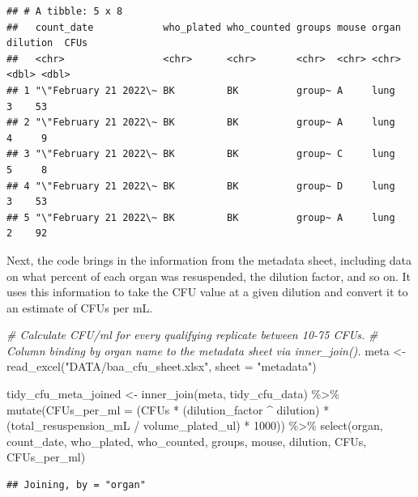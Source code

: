 \documentclass[
]{book}
\newenvironment{Shaded}{\begin{snugshade}}{\end{snugshade}}
\newcommand{\AttributeTok}[1]{\textcolor[rgb]{0.77,0.63,0.00}{#1}}
\newcommand{\CommentTok}[1]{\textcolor[rgb]{0.56,0.35,0.01}{\textit{#1}}}
\newcommand{\DecValTok}[1]{\textcolor[rgb]{0.00,0.00,0.81}{#1}}
\newcommand{\FunctionTok}[1]{\textcolor[rgb]{0.00,0.00,0.00}{#1}}
\newcommand{\NormalTok}[1]{#1}
\newcommand{\OtherTok}[1]{\textcolor[rgb]{0.56,0.35,0.01}{#1}}
\newcommand{\SpecialCharTok}[1]{\textcolor[rgb]{0.00,0.00,0.00}{#1}}
\newcommand{\StringTok}[1]{\textcolor[rgb]{0.31,0.60,0.02}{#1}}
\begin{document}
\begin{verbatim}
## # A tibble: 5 x 8
##   count_date            who_plated who_counted groups mouse organ dilution  CFUs
##   <chr>                 <chr>      <chr>       <chr>  <chr> <chr>    <dbl> <dbl>
## 1 "\"February 21 2022\~ BK         BK          group~ A     lung         3    53
## 2 "\"February 21 2022\~ BK         BK          group~ A     lung         4     9
## 3 "\"February 21 2022\~ BK         BK          group~ C     lung         5     8
## 4 "\"February 21 2022\~ BK         BK          group~ D     lung         3    53
## 5 "\"February 21 2022\~ BK         BK          group~ A     lung         2    92
\end{verbatim}

Next, the code brings in the information from the metadata sheet, including data on
what percent of each organ was resuspended, the dilution factor, and so on.
It uses this information to take the CFU value at a given dilution and convert
it to an estimate of CFUs per mL.

\begin{Shaded}
\begin{Highlighting}[]
\CommentTok{\# Calculate CFU/ml for every qualifying replicate between 10{-}75 CFUs. }
\CommentTok{\# Column binding by organ name to the metadata sheet via inner\_join().}
\NormalTok{meta }\OtherTok{\textless{}{-}} \FunctionTok{read\_excel}\NormalTok{(}\StringTok{"DATA/baa\_cfu\_sheet.xlsx"}\NormalTok{, }\AttributeTok{sheet =} \StringTok{"metadata"}\NormalTok{)}

\NormalTok{tidy\_cfu\_meta\_joined }\OtherTok{\textless{}{-}} \FunctionTok{inner\_join}\NormalTok{(meta, tidy\_cfu\_data) }\SpecialCharTok{\%\textgreater{}\%}
  \FunctionTok{mutate}\NormalTok{(}\AttributeTok{CFUs\_per\_ml =}\NormalTok{ (CFUs }\SpecialCharTok{*}\NormalTok{ (dilution\_factor }\SpecialCharTok{\^{}}\NormalTok{ dilution) }\SpecialCharTok{*} 
\NormalTok{                          (total\_resuspension\_mL }\SpecialCharTok{/}\NormalTok{ volume\_plated\_ul) }\SpecialCharTok{*} \DecValTok{1000}\NormalTok{)) }\SpecialCharTok{\%\textgreater{}\%}
  \FunctionTok{select}\NormalTok{(organ, count\_date, who\_plated, who\_counted, groups,  mouse, dilution,  }
\NormalTok{         CFUs, CFUs\_per\_ml) }
\end{Highlighting}
\end{Shaded}

\begin{verbatim}
## Joining, by = "organ"
\end{verbatim}
\end{document}
